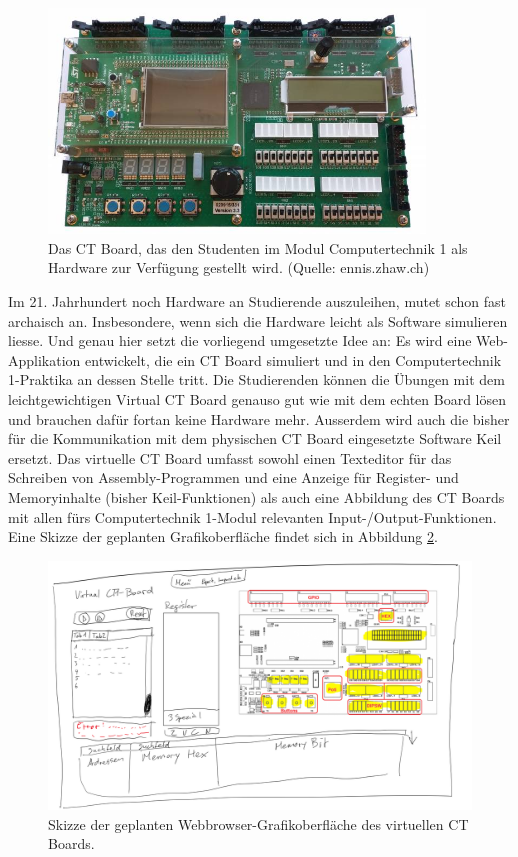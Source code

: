 \documentclass[10pt]{article}
\begin{document}
\begin{figure}[h]
\includegraphics[width=10cm]{ctboard}
\centering
\caption{Das CT Board, das den Studenten im Modul \glqq Computertechnik 1\grqq{} als Hardware zur Verfügung gestellt wird. (Quelle: ennis.zhaw.ch)}
\label{ctboard}
\end{figure}

Im 21. Jahrhundert noch Hardware an Studierende auszuleihen, mutet schon fast archaisch an. Insbesondere, wenn sich die Hardware leicht als Software simulieren liesse. Und genau hier setzt die vorliegend umgesetzte Idee an: Es wird eine Web-Applikation entwickelt, die ein CT Board simuliert und in den \glqq Computertechnik 1\grqq-Praktika an dessen Stelle tritt. Die Studierenden können die Übungen mit dem leichtgewichtigen \glqq Virtual CT Board\grqq{} genauso gut wie mit dem echten Board lösen und brauchen dafür fortan keine Hardware mehr. Ausserdem wird auch die bisher für die Kommunikation mit dem physischen CT Board eingesetzte Software Keil ersetzt. Das virtuelle CT Board umfasst sowohl einen Texteditor für das Schreiben von Assembly-Programmen und eine Anzeige für Register- und Memoryinhalte (bisher Keil-Funktionen) als auch eine Abbildung des CT Boards mit allen fürs  \glqq Computertechnik 1\grqq-Modul relevanten Input-/Output-Funktionen. Eine Skizze der geplanten Grafikoberfläche findet sich in Abbildung \ref{draft}.

\begin{figure}[h]
\includegraphics[width=\textwidth]{draft}
\caption[size=8pt]{Skizze der geplanten Webbrowser-Grafikoberfläche des virtuellen CT Boards.}
\label{draft}
\end{figure}
\end{document}
